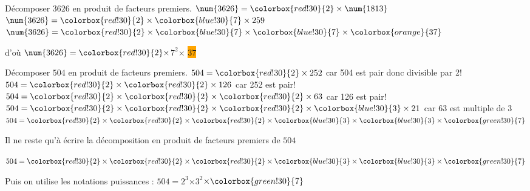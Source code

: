 \begin{exemple}
    Décomposer $\num{3626}$ en produit de facteurs premiers.
    \correction
    $\num{3626}=\colorbox{red!30}{2}\times \num{1813}$\\
    $\num{3626}=\colorbox{red!30}{2}\times\colorbox{blue!30}{7}\times 259$\\
    $\num{3626}=\colorbox{red!30}{2}\times\colorbox{blue!30}{7}\times\colorbox{blue!30}{7}\times \colorbox{orange}{37}$

    \medskip
    d'où $\num{3626}=\colorbox{red!30}{2}\times $\colorbox{blue!30}{$7^2$}$\times $ \colorbox{orange}{$37$}
\end{exemple}
\begin{exemple}
    Décomposer $\num{504}$ en produit de facteurs premiers.
    \correction
    $504=\colorbox{red!30}{2}\times 252$ car 504 est pair donc divisible par 2!\\
    $504=\colorbox{red!30}{2}\times\colorbox{red!30}{2}\times 126$ car 252 est pair!\\
    $504=\colorbox{red!30}{2}\times\colorbox{red!30}{2}\times\colorbox{red!30}{2}\times 63$ car 126 est pair!\\
    $504=\colorbox{red!30}{2}\times\colorbox{red!30}{2}\times\colorbox{red!30}{2}\times\colorbox{blue!30}{3}\times 21$ car 63 est multiple de 3\\
    $504=\colorbox{red!30}{2}\times\colorbox{red!30}{2}\times\colorbox{red!30}{2}\times\colorbox{blue!30}{3}\times\colorbox{blue!30}{3}\times \colorbox{green!30}{7}$
    
    \medskip
    Il ne reste qu'à écrire la décomposition en produit de facteurs premiers de $504$

    \medskip
    $504=\colorbox{red!30}{2}\times \colorbox{red!30}{2}\times \colorbox{red!30}{2}\times \colorbox{blue!30}{3}\times \colorbox{blue!30}{3}\times \colorbox{green!30}{7}$

    \medskip
    Puis on utilise les notations puissances : $504=$\colorbox{red!30}{$2^{3}$}$\times $\colorbox{blue!30}{$3^2$}$\times \colorbox{green!30}{7}$
\end{exemple}
